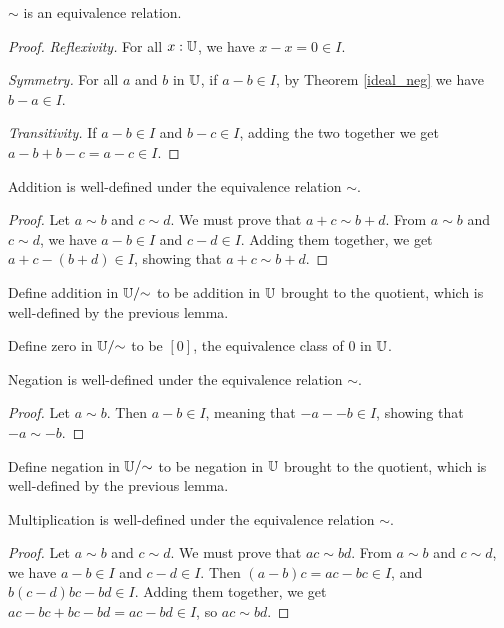 \documentclass[../../math.tex]{subfiles}
\begin{document}
\begin{lemma}
    $\sim$ is an equivalence relation.
\end{lemma}
\begin{proof}
    \textit{Reflexivity.} For all $x : \mathbb{U}$, we have $x - x = 0 \in I$.

    \textit{Symmetry.} For all $a$ and $b$ in $\mathbb{U}$, if $a - b \in I$, by Theorem
    \ref{ideal_neg} we have $b - a \in I$.

    \textit{Transitivity.}  If $a - b \in I$ and $b - c \in I$, adding the two
    together we get $a - b + b - c = a - c \in I$.
\end{proof}

\begin{lemma}
    Addition is well-defined under the equivalence relation $\sim$.
\end{lemma}
\begin{proof}
    Let $a \sim b$ and $c \sim d$.  We must prove that $a + c \sim b + d$.  From
    $a \sim b$ and $c \sim d$, we have $a - b \in I$ and $c - d \in I$.  Adding
    them together, we get $a + c - (b + d) \in I$, showing that $a + c \sim b +
    d$.
\end{proof}

\begin{instance}
    Define addition in $\mathbb{U}/{\sim}$ to be addition in $\mathbb{U}$ brought to the
    quotient, which is well-defined by the previous lemma.
\end{instance}

\begin{instance}
    Define zero in $\mathbb{U}/{\sim}$ to be $[0]$, the equivalence class of $0$ in
    $\mathbb{U}$.
\end{instance}

\begin{lemma}
    Negation is well-defined under the equivalence relation $\sim$.
\end{lemma}
\begin{proof}
    Let $a \sim b$.  Then $a - b \in I$, meaning that $-a - -b \in I$, showing
    that $-a \sim -b$.
\end{proof}

\begin{instance}
    Define negation in $\mathbb{U}/{\sim}$ to be negation in $\mathbb{U}$ brought to the
    quotient, which is well-defined by the previous lemma.
\end{instance}

\begin{lemma}
    Multiplication is well-defined under the equivalence relation $\sim$.
\end{lemma}
\begin{proof}
    Let $a \sim b$ and $c \sim d$.  We must prove that $ac \sim bd$.  From $a
    \sim b$ and $c \sim d$, we have $a - b \in I$ and $c - d \in I$.  Then $(a -
    b)c = ac - bc \in I$, and $b(c - d) bc - bd \in I$.  Adding them together,
    we get $ac - bc + bc - bd = ac - bd \in I$, so $ac \sim bd$.
\end{proof}
\end{document}
